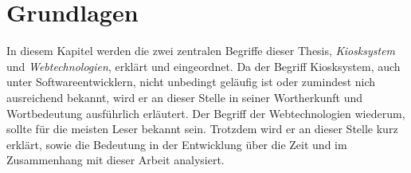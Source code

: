 \chapter{Grundlagen}
\label{chap:grundlagen}

In diesem Kapitel werden die zwei zentralen Begriffe dieser Thesis, \emph{Kiosksystem} und
\emph{Webtechnologien}, erklärt und eingeordnet. Da der Begriff
Kiosksystem, auch unter Softwareentwicklern, nicht unbedingt geläufig ist oder
zumindest nich ausreichend bekannt, wird er an dieser Stelle in seiner Wortherkunft
und Wortbedeutung ausführlich erläutert. Der Begriff der Webtechnologien wiederum, sollte
für die meisten Leser bekannt sein. Trotzdem wird er an dieser Stelle kurz erklärt, sowie
die Bedeutung in der Entwicklung über die Zeit und im Zusammenhang mit dieser Arbeit
analysiert.


